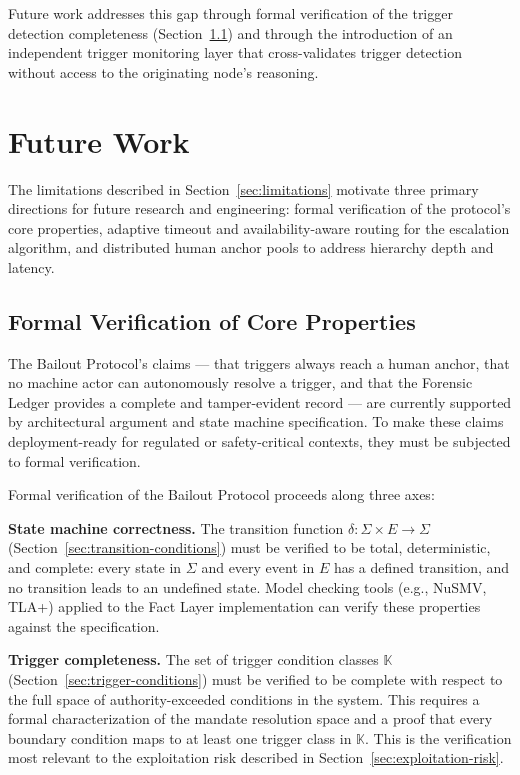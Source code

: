 Future work addresses this gap through formal verification of the trigger detection completeness (Section~\ref{sec:formal-verification}) and through the introduction of an independent trigger monitoring layer that cross-validates trigger detection without access to the originating node's reasoning.

\section{Future Work}
\label{sec:future-work}

The limitations described in Section~\ref{sec:limitations} motivate three primary directions for future research and engineering: formal verification of the protocol's core properties, adaptive timeout and availability-aware routing for the escalation algorithm, and distributed human anchor pools to address hierarchy depth and latency.

\subsection{Formal Verification of Core Properties}
\label{sec:formal-verification}

The Bailout Protocol's claims — that triggers always reach a human anchor, that no machine actor can autonomously resolve a trigger, and that the Forensic Ledger provides a complete and tamper-evident record — are currently supported by architectural argument and state machine specification. To make these claims deployment-ready for regulated or safety-critical contexts, they must be subjected to formal verification.

Formal verification of the Bailout Protocol proceeds along three axes:

\bigskip

\noindent\textbf{State machine correctness.} The transition function $\delta : \Sigma \times E \rightarrow \Sigma$ (Section~\ref{sec:transition-conditions}) must be verified to be total, deterministic, and complete: every state in $\Sigma$ and every event in $E$ has a defined transition, and no transition leads to an undefined state. Model checking tools (e.g., NuSMV, TLA+) applied to the Fact Layer implementation can verify these properties against the specification.

\bigskip

\noindent\textbf{Trigger completeness.} The set of trigger condition classes $\mathbb{K}$ (Section~\ref{sec:trigger-conditions}) must be verified to be complete with respect to the full space of authority-exceeded conditions in the system. This requires a formal characterization of the mandate resolution space and a proof that every boundary condition maps to at least one trigger class in $\mathbb{K}$. This is the verification most relevant to the exploitation risk described in Section~\ref{sec:exploitation-risk}.


